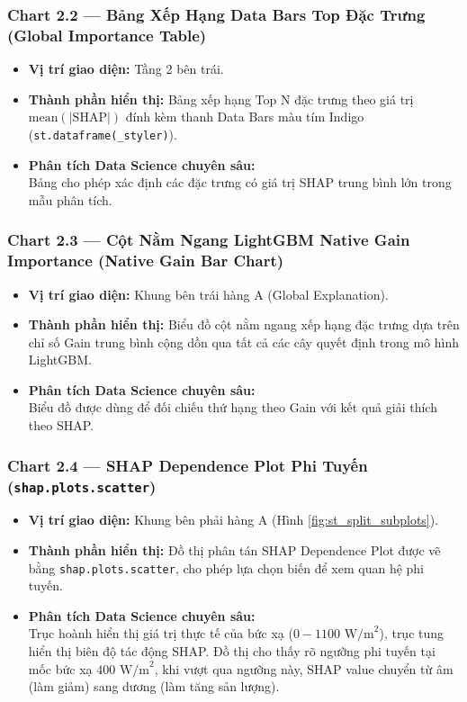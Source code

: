 \documentclass[12pt,a4paper]{article}
\begin{document}
\subsubsection{Chart 2.2 — Bảng Xếp Hạng Data Bars Top Đặc Trưng (Global Importance Table)}
\begin{itemize}
    \item \textbf{Vị trí giao diện:} Tầng 2 bên trái.
    \item \textbf{Thành phần hiển thị:} Bảng xếp hạng Top N đặc trưng theo giá trị $\text{mean}(|\text{SHAP}|)$ đính kèm thanh Data Bars màu tím Indigo\\(\texttt{st.dataframe(\_styler)}).
    \item \textbf{Phân tích Data Science chuyên sâu:}\\ 
    Bảng cho phép xác định các đặc trưng có giá trị SHAP trung bình lớn trong mẫu phân tích.
\end{itemize}

\subsubsection{Chart 2.3 — Cột Nằm Ngang LightGBM Native Gain Importance (Native Gain Bar Chart)}
\begin{itemize}
    \item \textbf{Vị trí giao diện:} Khung bên trái hàng A (Global Explanation).
    \item \textbf{Thành phần hiển thị:} Biểu đồ cột nằm ngang xếp hạng đặc trưng dựa trên chỉ số Gain trung bình cộng dồn qua tất cả các cây quyết định trong mô hình LightGBM.
    \item \textbf{Phân tích Data Science chuyên sâu:}\\ 
    Biểu đồ được dùng để đối chiếu thứ hạng theo Gain với kết quả giải thích theo SHAP.
\end{itemize}

\subsubsection[Chart 2.4 — SHAP Dependence Plot]{Chart 2.4 — SHAP Dependence Plot Phi Tuyến\\(\texttt{shap.plots.scatter})}
\begin{itemize}
    \item \textbf{Vị trí giao diện:} Khung bên phải hàng A (Hình \ref{fig:st_split_subplots}).
    \item \textbf{Thành phần hiển thị:} Đồ thị phân tán SHAP Dependence Plot được vẽ bằng \texttt{shap.plots.scatter}, cho phép lựa chọn biến để xem quan hệ phi tuyến.
    \item \textbf{Phân tích Data Science chuyên sâu:}\\ 
    Trục hoành hiển thị giá trị thực tế của bức xạ ($0 - 1100\text{ W/m}^2$), trục tung hiển thị biên độ tác động SHAP. Đồ thị cho thấy rõ ngưỡng phi tuyến tại mốc bức xạ $400\text{ W/m}^2$, khi vượt qua ngưỡng này, SHAP value chuyển từ âm (làm giảm) sang dương (làm tăng sản lượng).
\end{itemize}
\end{document}
